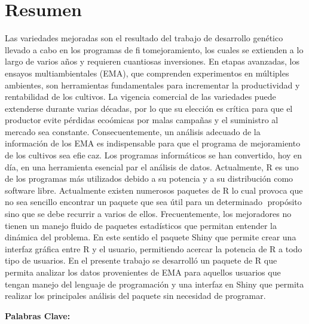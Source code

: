 
\chapter*{Resumen}

Las variedades mejoradas son el resultado del trabajo de desarrollo genético llevado a cabo en los programas de fitomejoramiento, los cuales se extienden a lo largo de varios años y requieren cuantiosas inversiones. En etapas avanzadas, los ensayos multiambientales (EMA), que comprenden experimentos en múltiples ambientes, son herramientas fundamentales para incrementar la productividad y rentabilidad de los cultivos. La vigencia comercial de las variedades puede extenderse durante varias décadas, por lo que su elección es crítica para que el productor evite pérdidas ecoómicas por malas campañas y el suministro al mercado sea constante. Consecuentemente, un análisis adecuado de la información de los EMA es indispensable para que el programa de mejoramiento de los cultivos sea efiecaz.
Los programas informáticos se han convertido, hoy en día, en una herramienta esencial par el análisis de datos. Actualmente, R es uno de los programas más utilizados debido a su potencia y a su distribución como software libre. Actualmente existen numerosos paquetes de R lo cual provoca que no sea sencillo encontrar un paquete que sea útil para un determinado propósito sino que se debe recurrir a varios de ellos. Frecuentemente, los mejoradores no tienen un manejo fluido de paquetes estadísticos que permitan entender la dinámica del problema. En este sentido el paquete Shiny que permite crear una interfaz gráfica entre R y el usuario, permitiendo acercar la potencia de R a todo tipo de usuarios. En el presente trabajo se desarrolló un paquete de R que permita analizar los datos provenientes de EMA para aquellos usuarios que tengan manejo del lenguaje de programación y una interfaz en Shiny que permita realizar los principales análisis del paquete sin necesidad de programar.

\textbf{Palabras Clave:}

